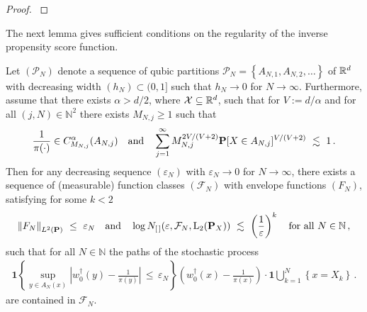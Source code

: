 \begin{proof}
  \emph{\cite[Corollary~2.7.4]{vaart2013}}
\end{proof}

The next lemma gives sufficient conditions on the regularity of the inverse propensity score function.
\begin{lemma}
  \label{lem:br_n_st}
  Let $(\mathcal{P}_N)$ denote a sequence of qubic partitions
  $\mathcal{P}_N=\left\{ A_{N,1},A_{N,2},\ldots \right\}$ 
  of $\mathbb{R}^d$ 
  with decreasing width $(h_N)\subset(0,1]$ such that $h_N\to 0$ for $N\to\infty$.
  Furthermore, assume that there exists
  $\alpha>d/2$, where $\mathcal{X}\subseteq \mathbb{R}^d$, such
  that for 
  $V:=d/\alpha$
 and for all 
$
(j,N)\in\mathbb{N}^2
$
there exists 
$M_{N,j}\ge 1$ such that 
\begin{gather}
  \label{0897}
  \frac{1}{\pi(\cdot)}
  \in C^\alpha_{M_{N,j}}(A_{N,j})
  \quad
  \text{and}
  \quad
  \sum_{j=1}^{\infty} 
  M_{N,j}^{2V/(V+2)}
  \P
  [
  X\in A_{N,j}
  ]^{V/(V+2)}
  \ 
  \lesssim
  \ 
  1
  \,.
\end{gather}
Then for any decreasing sequence
  $(\varepsilon_N)$ with $\varepsilon_N\to 0$ for $N\to\infty$,
there exists a sequence of (measurable) function classes
$(\mathcal{F}_N)$
with envelope functions
$(F_N)$,
satisfying 
for some $k<2$
\begin{gather*}
\norm{F_N}_{L^2(\P)}
\ 
\le
\ 
\varepsilon_N
\quad
\text{and}
\quad
  \log
  N_{[\,]}(\varepsilon,\mathcal{F}_N,\mathrm{L}_2(\P_{X}))
  \ 
  \lesssim
  \ 
  \left( 
  \frac{1}{\varepsilon}
  \right)^k
  \quad
  \text{for all}
  \ 
  N\in\mathbb{N}
  \,,
\end{gather*}
such that
for all $N\in\mathbb{N}$ the paths of the stochastic process
\begin{gather}
  \label{error_process}
  \mathbf{1}{
    \left\{ 
      \sup_{y\in A_N(x)}
      \left| 
      w_0^\dagger(y)
      -
      \frac{1}{\pi(y)}
      \right|
      \,
      \le
      \,
      \varepsilon_N
    \right\}
  }
  \left( 
    w_0^\dagger(x)
      -
      \frac{1}{\pi(x)}
  \right)
  \cdot
  \mathbf{1}
  \bigcup_{k=1}^N
  \left\{ x=X_k \right\}
  \,.
\end{gather}
are contained in $\mathcal{F}_N$.
\end{lemma}
